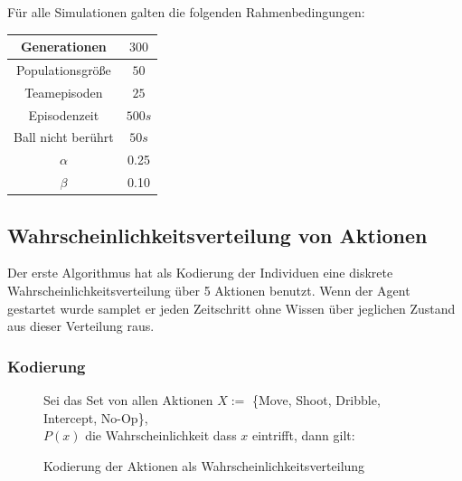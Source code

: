         \noindent
        Für alle Simulationen galten die folgenden Rahmenbedingungen:

        \begin{center}
            \begin{tabular}{ |c|c| } 
                \hline
                Generationen       & $300$  \\ \hline
                Populationsgröße   & $50$   \\ \hline
                Teamepisoden       & $25$   \\ \hline
                Episodenzeit       & $500s$ \\ \hline
                Ball nicht berührt & $50s$  \\ \hline
                $\alpha$           & 0.25   \\ \hline
                $\beta$            & 0.10   \\ \hline
            \end{tabular}
        \end{center}

        \subsection{Wahrscheinlichkeitsverteilung von Aktionen}

            Der erste Algorithmus hat als Kodierung der Individuen eine diskrete Wahrscheinlichkeitsverteilung über 5 Aktionen benutzt. Wenn der Agent gestartet wurde samplet er jeden Zeitschritt ohne Wissen über jeglichen Zustand aus dieser Verteilung raus.

            \subsubsection*{Kodierung}

            \begin{figure}[H]
                \begin{mdframed}
                    Sei das Set von allen Aktionen $ X := $ \{Move, Shoot, Dribble, Intercept, No-Op\}, \\
                    $P(x)$ die Wahrscheinlichkeit dass $x$ eintrifft, dann gilt: \\[2mm]
                    \hspace*{25mm} 
                \end{mdframed}
                \caption{\label{kodierung} Kodierung der Aktionen als Wahrscheinlichkeitsverteilung}
            \end{figure}


